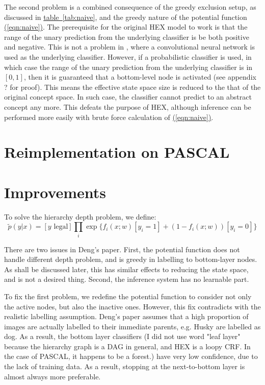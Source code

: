 \documentclass[11pt,a4paper]{article}
\begin{document}
The second problem is a combined consequence of the greedy exclusion setup, as discussed in \hyperref[tab:naive]{table~\ref{tab:naive}}, and the greedy nature of the potential function \hyperref[eqn:naive]{(\ref{eqn:naive})}. The prerequisite for the original HEX model to work is that the range of the unary prediction from the underlying classifier is be both positive and negative. This is not a problem in \cite{deng2014large}, where a convolutional neural network \cite{krizhevsky2012imagenet} is used as the underlying classifier. However, if a probabilistic classifier is used, in which case the range of the unary prediction from the underlying classifier is in $[0,1]$, then it is guaranteed that a bottom-level node is activated (see appendix ? for proof). This means the effective state space size is reduced to the that of the original concept space. In such case, the classifier cannot predict to an abstract concept any more. This defeats the purpose of HEX, although inference can be performed more easily with brute force calculation of \hyperref[eqn:naive]{(\ref{eqn:naive})}.

\section{Reimplementation on PASCAL}

\section{Improvements}

To solve the hierarchy depth problem, we define:
\[\tilde{p}(y|x)=[y\text{ legal}]\prod_i\exp\{f_i(x;w)[y_i=1]+(1-f_i(x;w))[y_i=0]\}\]

There are two issues in Deng's paper. First, the potential function does not handle different depth problem, and is greedy in labelling to bottom-layer nodes. As shall be discussed later, this has similar effects to reducing the state space, and is not a desired thing. Second, the inference system has no learnable part.

To fix the first problem, we redefine the potential function to consider not only the active nodes, but also the inactive ones. However, this fix contradicts with the realistic labelling assumption. Deng's paper assumes that a high proportion of images are actually labelled to their immediate parents, e.g. Husky are labelled as dog. As a result, the bottom layer classifiers (I did not use word "leaf layer" because the hierarchy graph is a DAG in general, and HEX is a loopy CRF. In the case of PASCAL, it happens to be a forest.) have very low confidence, due to the lack of training data. As a result, stopping at the next-to-bottom layer is almost always more preferable.
\end{document}
